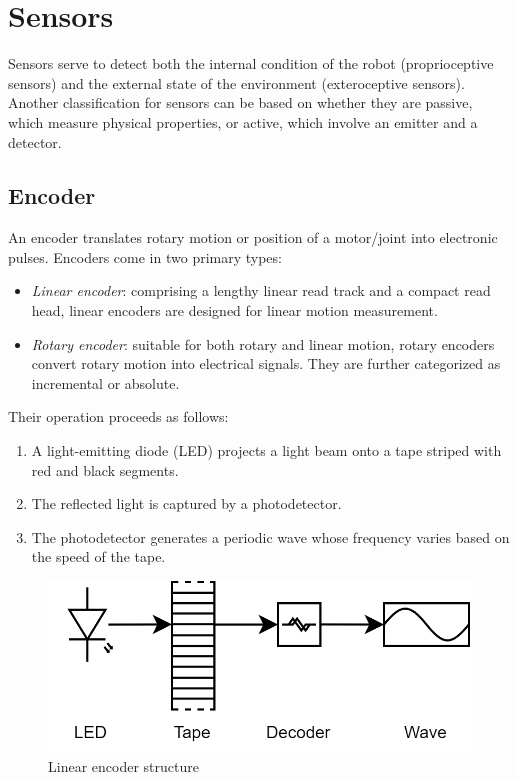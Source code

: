 \section{Sensors}

Sensors serve to detect both the internal condition of the robot (proprioceptive sensors) and the external state of the environment (exteroceptive sensors).
Another classification for sensors can be based on whether they are passive, which measure physical properties, or active, which involve an emitter and a detector.

\subsection{Encoder}
An encoder translates rotary motion or position of a motor/joint into electronic pulses. 
Encoders come in two primary types:
\begin{itemize}
    \item \textit{Linear encoder}: comprising a lengthy linear read track and a compact read head, linear encoders are designed for linear motion measurement.
    \item \textit{Rotary encoder}: suitable for both rotary and linear motion, rotary encoders convert rotary motion into electrical signals. 
        They are further categorized as incremental or absolute.
\end{itemize}
Their operation proceeds as follows:
\begin{enumerate}
    \item A light-emitting diode (LED) projects a light beam onto a tape striped with red and black segments.
    \item The reflected light is captured by a photodetector.
    \item The photodetector generates a periodic wave whose frequency varies based on the speed of the tape.
\end{enumerate}
\begin{figure}[H]
    \centering
    \includegraphics[width=0.6\linewidth]{images/encoder.png}
    \caption{Linear encoder structure}
\end{figure}


